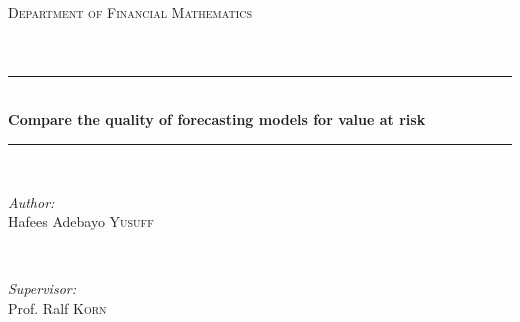 \begin{titlepage}

\newcommand{\HRule}{\rule{\linewidth}{0.5mm}} %

\center %
 

\textsc{\LARGE Department of Financial Mathematics}\\[1.5cm] %
\textsc{\Large }\\[0.5cm] %
\textsc{\large }\\[0.5cm] %


\HRule \\[0.5cm]
{ \huge \bfseries Compare the quality of forecasting models for value at risk}\\[0.1cm] %
\HRule \\[1.5cm]
\vspace{2.5cm}
 


\begin{minipage}{0.4\textwidth}
\begin{flushleft} \large
\emph{Author:}\\
Hafees Adebayo \textsc{Yusuff} %
\end{flushleft}
\end{minipage}
~
\begin{minipage}{0.4\textwidth}
\begin{flushleft} \large
\emph{Supervisor:} \\
Prof. Ralf \textsc{Korn} %
\end{flushleft}
\end{minipage}\\[4cm]



\end{titlepage}
